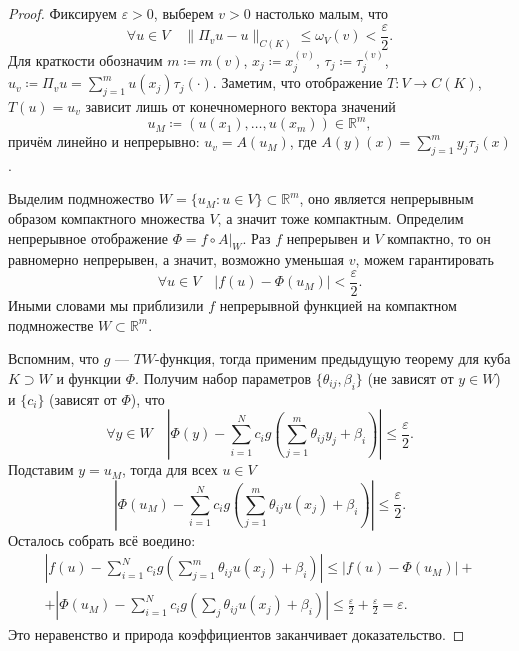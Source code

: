 \documentclass[a4paper, 12pt]{article}
\theoremstyle{definition}
\theoremstyle{plain}
\theoremstyle{remark}
\theoremstyle{remark}
\theoremstyle{remark}
\begin{document}
\begin{proof}
  Фиксируем $\varepsilon > 0$, выберем $v > 0$ настолько малым, что
  $$\forall u \in V \quad \|\Pi_v u - u\|_{C(K)} \le \omega_V (v) < \frac{\varepsilon}{2}.$$
  Для краткости обозначим $m \coloneq m(v)$, $x_j \coloneq x_j^{(v)}$, $\tau_j \coloneq \tau_j^{(v)}$, $u_v \coloneq \Pi_v u = \sum_{j=1}^m u(x_j) \tau_j(\cdot)$.
  Заметим, что отображение $T\colon V \to C(K)$, $T(u) = u_v$ зависит лишь от конечномерного вектора значений
  $$u_M \coloneq \left(u(x_1), \dots, u(x_m)\right) \in \mathbb{R}^m,$$
  причём линейно и непрерывно: $u_v = A(u_M)$, где $A(y)(x) = \sum_{j=1}^m y_j \tau_j(x)$.

  Выделим подмножество $W = \{u_M : u \in V\} \subset \mathbb{R}^m$, оно является непрерывным образом компактного множества $V$, а значит тоже компактным.
  Определим непрерывное отображение $\Phi = f \circ A \big|_W$.
  Раз $f$ непрерывен и $V$ компактно, то он равномерно непрерывен, а значит, возможно уменьшая $v$, можем гарантировать
  $$\forall u \in V \quad |f(u) - \Phi(u_M)| < \frac{\varepsilon}{2}.$$
  Иными словами мы приблизили $f$ непрерывной функцией на компактном подмножестве $W \subset \mathbb{R}^m$.

  Вспомним, что $g$ --- $TW$-функция, тогда применим предыдущую теорему для куба $K \supset W$ и функции $\Phi$.
  Получим набор параметров $\{\theta_{ij}, \beta_i\}$ (не зависят от $y \in W$) и $\{c_i\}$ (зависят от $\Phi$), что
  $$\forall y \in W \quad \left|\Phi(y) - \sum_{i=1}^{N} c_i g\left(\sum_{j=1}^{m} \theta_{ij} y_j + \beta_i\right)\right| \le \frac{\varepsilon}{2}.$$
  Подставим $y = u_M$, тогда для всех $u \in V$
  $$\left|\Phi(u_M) - \sum_{i=1}^{N} c_i g\left(\sum_{j=1}^{m} \theta_{ij} u(x_j) + \beta_i\right)\right| \le \frac{\varepsilon}{2}.$$
  Осталось собрать всё воедино:
  \begin{multline*}
    \left|f(u) - \sum_{i=1}^{N} c_i g\left(\sum_{j=1}^{m} \theta_{ij} u(x_j) + \beta_i\right)\right| \le |f(u) - \Phi(u_M)| + \\
    + \left|\Phi(u_M) - \sum_{i=1}^{N} c_i g\left(\sum_{j} \theta_{ij} u(x_j) + \beta_i\right)\right| \le \frac{\varepsilon}{2} + \frac{\varepsilon}{2} = \varepsilon.
  \end{multline*}
  Это неравенство и природа коэффициентов заканчивает доказательство.
\end{proof}
\end{document}
